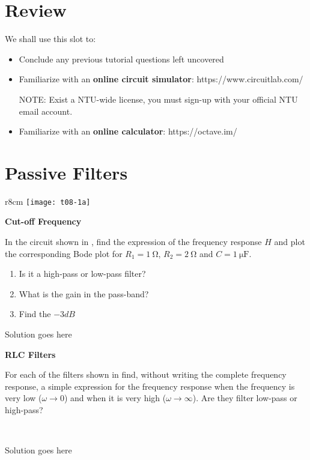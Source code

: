 \documentclass[10pt,a4paper]{memoir}
\begin{document}
\chapter{Review}
We shall use this slot to:
\begin{itemize}
  \item Conclude any previous tutorial questions left uncovered
  \item Familiarize with an \textbf{online circuit simulator}: https://www.circuitlab.com/
  
  NOTE: Exist a NTU-wide license, you must sign-up with your official NTU email account.
  \item Familiarize with an \textbf{online calculator}: https://octave.im/
\end{itemize}

\chapter{Passive Filters}

\begin{question}
  \begin{wrapfigure}{r}{8cm}
    \centering
    \texttt{[image: t08-1a]}
    \caption{}
    \label{fig:t08-1a}
  \end{wrapfigure}
  \textbf{Cut-off Frequency}
  
  In the circuit shown in , find the expression of the frequency response $H$ and plot the corresponding Bode plot for $R_1=\SI{1}{\ohm}$, $R_2=\SI{2}{\ohm}$ and $C=\SI{1}{\micro\farad}$.
  \begin{enumerate}
    \item Is it a high-pass or low-pass filter?
    \item What is the gain in the pass-band?
    \item Find the $-3\si{dB}$
  \end{enumerate}
\end{question}
\begin{solution}
  Solution goes here
\end{solution}

\newpage
\begin{question}
  \textbf{RLC Filters}
  
  For each of the filters shown in  find, without writing the complete frequency response, a simple expression for the frequency response when the frequency is very low ($\omega\to 0$) and when it is very high ($\omega\to\infty$). Are they filter low-pass or high-pass?
  \begin{figure}[!h]
    \centering
    \subfloat[]{\texttt{[image: t08-2a]}} \qquad\qquad
    \subfloat[]{\texttt{[image: t08-2b]}} \\
    \subfloat[]{\texttt{[image: t08-2c]}} \qquad\qquad
    \subfloat[]{\texttt{[image: t08-2d]}}
    \caption{}
    \label{fig:t08-2}
  \end{figure}
\end{question}
\begin{solution}
  Solution goes here
\end{solution}
\end{document}
